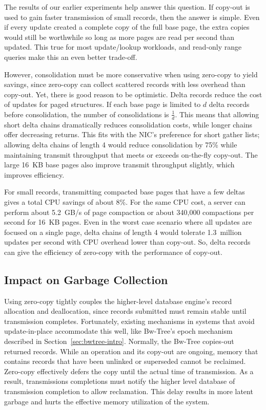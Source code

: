 %





The results of our earlier experiments help answer this question.  If copy-out
is used to gain faster transmission of small records, then the answer is
simple. Even if every update created a complete copy of the full base page, the
extra copies would still be worthwhile so long as more pages are read per
second than updated. This true for most update/lookup workloads, and read-only
range queries make this an even better trade-off.

However, consolidation must be more conservative when using zero-copy to yield
savings, since zero-copy can collect scattered records with less overhead than
copy-out. Yet, there is good reason to be optimistic.  Delta records
reduce the cost of updates for paged structures. If each base page is limited
to $d$ delta records before consolidation, the number of consolidations is
$\frac{1}{d}$. This means that allowing short delta chains dramatically reduces
consolidation costs, while longer chains offer decreasing returns. This fits with
the NIC's preference for short gather lists; allowing delta chains of length 4
would reduce consolidation by 75\% while maintaining transmit throughput that
meets or exceeds on-the-fly copy-out.  The large 16~KB base pages also
improve transmit throughput slightly, which improves efficiency.

For small records, transmitting compacted base pages that have a few deltas gives
a total CPU savings of about 8\%. For the same CPU cost, a server can perform
about 5.2~GB/s of page compaction or about 340,000 compactions per second for
16~KB pages. Even in the worst case scenario where all updates are focused on a
single page, delta chains of length 4 would tolerate 1.3~million updates per
second with CPU overhead lower than copy-out. So, delta records can give the
efficiency of zero-copy with the performance of copy-out.


\subsection{Impact on Garbage Collection}

Using zero-copy tightly couples the higher-level database engine's record
allocation and deallocation, since records submitted must remain stable until
transmission completes. Fortunately, existing mechanisms in systems that avoid
update-in-place accommodate this well, like Bw-Tree's epoch mechanism described
in Section~\ref{sec:bwtree-intro}. Normally, the Bw-Tree copies-out returned records.
While an operation and its copy-out are ongoing, memory that contains records
that have been unlinked or superseded cannot be reclaimed. Zero-copy
effectively defers the copy until the actual time of transmission. As a result,
transmissions completions must notify the higher level database of transmission
completion to allow reclamation. This delay results in more latent garbage and
hurts the effective memory utilization of the system.

